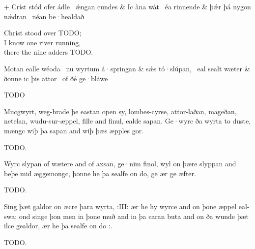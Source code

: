 \bvg{}
\bva[0]+ Críst stód ofer ádle \hld\ ǽngan cundes &
Ic àna wàt \hld\ éa rinnende &
þǽr þá nygon nǽdran \hld\ néan be·healdað\eva

\bvb Christ stood over TODO; \\
I know one river running, \\
there the nine adders TODO.\evb
\evg


\bvg{}
\bva[0]Motan ealle wéoda \hld\ nu wyrtum á·springan &
sǽs tó·slúpan, \hld\ eal sealt wæter &
ðonne ic þis attor \hld\ of ðé ge·bláwe\eva

\bvb TODO\evb
\evg


\bpg\bpa Mucgwyrt, weg-brade þe eastan open sy, lombes-cyrse, attor-laðan, mageðan, netelan, wudu-sur-æppel, fille and finul, ealde sapan. Ge·wyrc ða wyrta to duste, mængc wiþ þa sapan and wiþ þæs æpples gor.\epa

\bpb TODO.\epb\epg


\bpg\bpa Wyrc slypan of wætere and of axsan, ge·nim finol, wyl on þære slyppan and beþe mid æggemongc, þonne he þa sealfe on do, ge ær ge æfter.\epa

\bpb TODO.\epb\epg


\bpg\bpa Sing þæt galdor on æcre þara wyrta, :III: ær he hy wyrce and on þone æppel eal-swa; ond singe þon men in þone muð and in þa earan buta and on ða wunde þæt ilce gealdor, ær he þa sealfe on do :.\epa

\bpb TODO.\epb\epg
